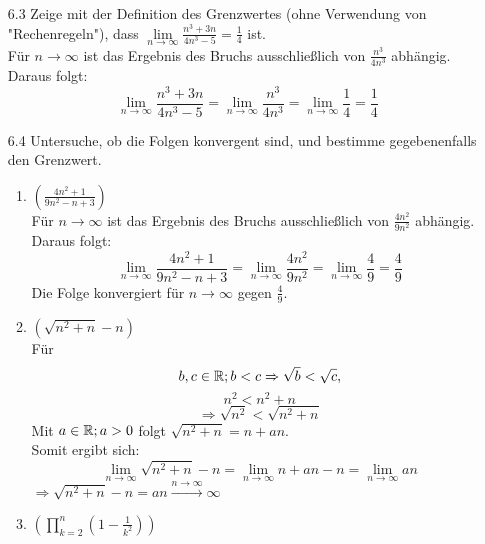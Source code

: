 \documentclass{HM}
\begin{document}
\newcommand\rcancel[1]{\renewcommand\CancelColor{\color{red}}\cancel{#1}}
\newcommand\gcancel[1]{\renewcommand\CancelColor{\color{green}}\cancel{#1}}
\newcommand\dcancel[1]{\renewcommand\CancelColor{\color{black}}\cancel{#1}}
\begin{enumerate}
	\item[6.3] Zeige mit der Definition des Grenzwertes (ohne Verwendung von "Rechenregeln"), dass $\lim\limits_{n\to\infty}\frac{n^3+3n}{4n^3-5}=\frac{1}{4}$ ist.\\
	Für $n\to\infty$ ist das Ergebnis des Bruchs ausschließlich von $\frac{n^3}{4n^3}$ abhängig. Daraus folgt:\\
	$$\lim\limits_{n\to\infty}\frac{n^3+3n}{4n^3-5}=\lim\limits_{n\to\infty}\frac{n^3}{4n^3}=\lim\limits_{n\to\infty}\frac{1}{4}=\frac{1}{4}$$
	\item[6.4] Untersuche, ob die Folgen konvergent sind, und bestimme gegebenenfalls den Grenzwert.
	\begin{enumerate}
		\item $\left(\frac{4n^2+1}{9n^2-n+3}\right)$\\
		Für $n\to\infty$ ist das Ergebnis des Bruchs ausschließlich von $\frac{4n^2}{9n^2}$ abhängig. Daraus folgt:\\
		$$\lim\limits_{n\to\infty}\frac{4n^2+1}{9n^2-n+3}
		=\lim\limits_{n\to\infty}\frac{4n^2}{9n^2}
		=\lim\limits_{n\to\infty}\frac{4}{9}
		=\frac{4}{9}$$
		Die Folge konvergiert für $n\to\infty$ gegen $\frac{4}{9}$.
		
		\item $\left(\sqrt{n^2+n}-n\right)$\\
		Für $$b,c\in\mathbb{R};b<c \Rightarrow\sqrt{b}<\sqrt{c},$$
		$$n^2<n^2+n$$
		$$\Rightarrow\sqrt{n^2}<\sqrt{n^2+n}$$
		Mit $a\in\mathbb{R}; a>0$ folgt $\sqrt{n^2+n}=n+an$.\\
		Somit ergibt sich:
		$$\lim\limits_{n\to\infty}\sqrt{n^2+n}-n
		=\lim\limits_{n\to\infty}n+an-n
		=\lim\limits_{n\to\infty}an$$
		$\Rightarrow \sqrt{n^2+n}-n=an\xrightarrow{n\to\infty}\infty$
		
		\item $\left(\prod\limits_{k=2}^n\left(1-\frac{1}{k^2}\right)\right)$\\
		

\end{enumerate}
\end{enumerate}
\end{document}
